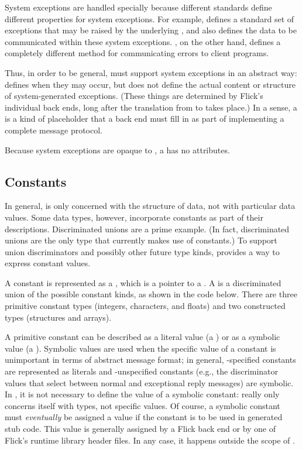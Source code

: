 System exceptions are handled specially because different \RPC{} standards
define different properties for system exceptions.  For example, \CORBA{}
defines a standard set of exceptions that may be raised by the underlying
\ORB{}, and also defines the data to be communicated within these system
exceptions.  \ONCRPC{}, on the other hand, defines a completely different
method for communicating \RPC{} errors to client programs.

Thus, in order to be general, \MINT{} must support system exceptions in an
abstract way: \MINT{} defines when they may occur, but does not define the
actual content or structure of system-generated exceptions.  (These things are
determined by Flick's individual back ends, long after the translation from
\AOI{} to \MINT{} takes place.)  In a sense, a  is a
kind of placeholder that a back end must fill in as part of implementing a
complete message protocol.

Because system exceptions are opaque to \MINT{}, a 
has no attributes.



\subsection{Constants}
\label{subsec:MINT:Constants}

In general, \MINT{} is only concerned with the structure of data, not with
particular data values.  Some data types, however, incorporate constants as
part of their descriptions.  Discriminated unions are a prime example.  (In
fact, discriminated unions are the only \MINT{} type that currently makes use
of constants.)  To support union discriminators and possibly other future
\MINT{} type kinds, \MINT{} provides a way to express constant values.

A constant is represented as a , which is a pointer to a
.  A  is a discriminated union of the
possible constant kinds, as shown in the code below.  There are three primitive
constant types (integers, characters, and floats) and two constructed types
(structures and arrays).

A primitive constant can be described as a literal value (a
) or as a symbolic value (a
)\@.  Symbolic values are used when the specific value
of a constant is unimportant in terms of abstract message format; in general,
\IDL{}-specified constants are represented as literals and \IDL{}-unspecified
constants (e.g., the discriminator values that select between normal and
exceptional reply messages) are symbolic.  In \MINT{}, it is not necessary to
define the value of a symbolic constant: \MINT{} really only concerns itself
with types, not specific values.  Of course, a symbolic constant must
\emph{eventually} be assigned a value if the constant is to be used in
generated stub code.  This value is generally assigned by a Flick back end or
by one of Flick's runtime library header files.  In any case, it happens
outside the scope of \MINT{}\@.

